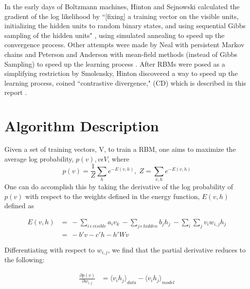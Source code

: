 \documentclass[journal]{IEEEtran}
\begin{document}
In the early days of Boltzmann machines, Hinton and Sejnowski calculated the gradient of the log likelihood by ``[fixing] a training vector on the visible units, initializing the hidden units to random binary states, and using sequential Gibbs sampling of the hidden units" \cite{ackley1985learning}, using simulated annealing to speed up the convergence process.  Other attempts were made by Neal with persistent Markov chains \cite{neal1992connectionist} and Peterson and Anderson with mean-field methods (instead of Gibbs Sampling) to speed up the learning process \cite{peterson1987mean}. After RBMs were posed as a simplifying restriction by Smolensky, Hinton discovered a way to speed up the learning process, coined ``contrastive divergence," (CD) which is described in this report \cite{carreira2005contrastive,hinton2006fast,hinton2010practical}.  


\section{Algorithm Description}
Given a set of training vectors, V, to train a RBM, one aims to maximize the average log probability, $p(v), v \epsilon V$, where
\begin{equation}
p(v) = \frac{1}{Z} \sum\limits_{h} e^{-E(v,h)},\;
Z = \sum\limits_{v,h} e^{-E(v,h)}
\end{equation}
One can do accomplish this by taking the derivative of the log probability of $p(v)$ with respect to the weights defined in the energy function, $E(v,h)$ defined as

\begin{equation}
\begin{aligned}
E(v,h) &= \:- \sum\limits_{i \, \epsilon \, visible} a_{i}v_{k} \: - \sum\limits_{j \, \epsilon \, hidden} b_{j}h_{j} \: - \sum\limits_{i}\sum\limits_{j} v_{i}w_{i,j}h_{j}\\
&=\: -b'v - c'h - h'Wv
\end{aligned}
\end{equation}

Differentiating with respect to $w_{i,j}$, we find that the partial derivative reduces to the following:

\begin{equation}
\begin{aligned}
\frac{\partial p(v)}{\partial w_{i,j}} & = {\langle v_{i} h_{j} \rangle}_{data} - {\langle v_{i} h_{j} \rangle}_{model} \\
\end{aligned}
\end{equation}
\end{document}
